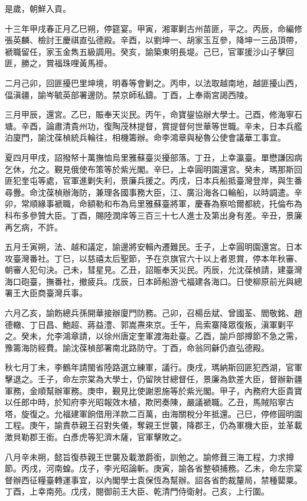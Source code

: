 \begin{pinyinscope}
是歲，朝鮮入貢。

十三年甲戌春正月乙巳朔，停筵宴。甲寅，湘軍剿古州苗匪，平之。丙辰，命編修張英麟、檢討王慶祺直弘德殿。辛酉，以劉坤一、胡家玉互參，降坤一三品頂帶，褫職留任，家玉金雋五級調用。癸亥，諭築東明長堤。己巳，官軍援沙山子擊回匪，勝之，賞福珠哩黃馬褂。

二月己卯，回匪擾巴里坤境，明春等會剿之。丙申，以法取越南地，越匪擾山西，偪滇疆，諭岑毓英部署邊防。禁京師私鑄。丁酉，上奉兩宮謁西陵。

三月甲辰，還宮。乙巳，賑奉天災民。丙午，命寶鋆協辦大學士。己酉，修海寧石塘。辛酉，論肅清貴州功，復陶茂林提督，賞提督何世華等世職。辛未，日本兵艦泊廈門，諭沈葆楨統兵輪往，相機籌辦。命李鴻章與秘魯公使會議華工事宜。

夏四月甲戌，詔撥帑十萬撫恤烏里雅蘇臺災擾部落。丁丑，上幸瀛臺。單懋謙因病乞休，允之。覲見俄使布策等於紫光閣。辛巳，上幸圓明園還宮。癸未，瑪那斯回匪犯奎屯等處，官軍進剿失利，景廉兵援之。丙戌，日本兵船抵臺灣登岸，與生番尋釁。命沈葆楨辦海防，兼理各國事務大臣，江、廣沿海各口輪船，以時調遣。辛卯，常順緣事褫職，命額勒和布為烏里雅蘇臺將軍，慶春為察哈爾都統，托倫布為科布多參贊大臣。丁酉，賜陸潤庠等三百三十七人進士及第出身有差。辛丑，景廉再乞病，不許。

五月壬寅朔，法、越和議定，諭邊將安輯內遷難民。壬子，上幸圓明園還宮。日本攻臺灣番社。丁巳，以慈禧太后聖節，予在京旗官六十以上者恩賞，停本年秋審、朝審人犯句決。己未，彗星見。乙丑，詔賑奉天災民。丙辰，允沈葆楨請，建臺灣海口砲臺，撫番社，撤疲兵。戊辰，日本師船游弋福建各海口。日使柳原前光與總署王大臣商臺灣兵事。

六月乙亥，諭飭總兵孫開華接辦廈門防務。己卯，召楊岳斌、曾國荃、閻敬銘、趙德轍、丁日昌、鮑超、蔣益澧、郭嵩燾來京。壬午，烏索寨降眾復叛，滇軍剿平之。癸未，允李鴻章請，以徐州唐定奎軍渡海赴臺。乙酉，諭戶部撙節不急之需，豫籌海防經費。諭沈葆楨部署南北路防守。丁酉，命翁同龢仍直弘德殿。

秋七月丁未，李鶴年請閩省陸路選立練軍，議行。庚戌，瑪納斯回匪犯西湖，官軍擊退之。壬子，命左宗棠為大學士，仍留陜甘總督任，景廉為欽差大臣，督辦新疆軍務，金順幫辦軍務。庚申，覲見比使謝恩施等於紫光閣。甲子，內務府大臣貴寶以任郎中時，於知府李光昭報效木植，欺罔奏陳，嚴議褫職。乙丑，馬賊陷寧古塔，旋復之。允福建軍餉借用洋款二百萬，由海關稅分年抵還。己巳，停修圓明園工程。庚午，諭責恭親王召對失儀，奪親王世襲，降郡王，仍為軍機大臣，並革載澂貝勒郡王銜。白彥虎等犯濟木薩，官軍擊敗之。

八月辛未朔，懿旨復恭親王世襲及載澂爵銜，訓勉之。諭修葺三海工程，力求撙節。丙戌，河南蝗。戊子，李光昭論斬。庚寅，諭各省整頓捕務。乙未，命左宗棠督辦西征糧臺轉運事宜，以內閣學士袁保恆為幫辦。詔各省酌裁釐局，禁種罌粟。丁酉，上幸南苑。戊戌，閱御前王大臣、乾清門侍衛射。己亥，上行圍。


\end{pinyinscope}
